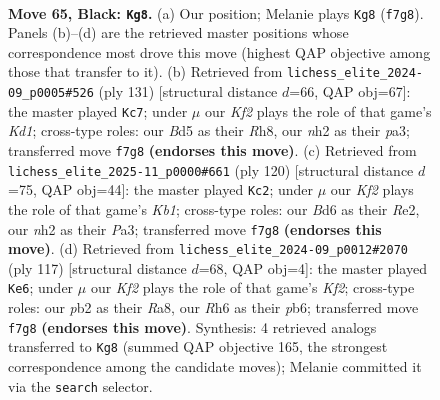\documentclass[11pt]{article}
\begin{document}
\begin{figure}[p]\centering
\begin{subfigure}{0.46\textwidth}\centering
\resizebox{\linewidth}{!}{%
\newchessgame
\chessboard[
  setfen={4r3/5kp1/p2b3r/Pppb1p1p/2p2P1P/2B1P1P1/1P2K2N/1R4R1 b - - 3 65},
  showmover=false,
  pgfstyle=straightmove, color=movearrow, markmove={f7-g8}
]}
\caption{}
\end{subfigure}\hfill
\begin{subfigure}{0.46\textwidth}\centering
\resizebox{\linewidth}{!}{%
\newchessgame
\chessboard[
  setfen={2rk3r/3b1p2/4p1p1/1p1pP2p/pP3P2/P1P1K1P1/2R1B2P/3R4 b - - 72 66},
  showmover=false,
  pgfstyle=straightmove, color=movearrow, markmove={d8-c7}
]}
\caption{}
\end{subfigure}
\\[4pt]
\begin{subfigure}{0.46\textwidth}\centering
\resizebox{\linewidth}{!}{%
\newchessgame
\chessboard[
  setfen={8/8/r1r1pp2/1R1p1kp1/p2P3p/P1P2PbP/3BR1P1/1K6 w - - 16 61},
  showmover=false,
  pgfstyle=straightmove, color=movearrow, markmove={b1-c2}
]}
\caption{}
\end{subfigure}\hfill
\begin{subfigure}{0.46\textwidth}\centering
\resizebox{\linewidth}{!}{%
\newchessgame
\chessboard[
  setfen={r7/1b3k2/1Pp2pp1/r1Pp3p/PK2p3/2R1P1P1/4BP2/R7 b - - 5 59},
  showmover=false,
  pgfstyle=straightmove, color=movearrow, markmove={f7-e6}
]}
\caption{}
\end{subfigure}
\caption{\textbf{Move 65, Black: \texttt{Kg8}.} (a) Our position; Melanie plays \texttt{Kg8} (\texttt{f7g8}). Panels (b)--(d) are the retrieved master positions whose correspondence most drove this move (highest QAP objective among those that transfer to it). (b) Retrieved from \texttt{lichess\_elite\_2024-09\_p0005\#526} (ply 131) [structural distance $d$=66, QAP obj=67]: the master played \texttt{Kc7}; under $\mu$ our \emph{Kf2} plays the role of that game's \emph{Kd1}; cross-type roles: our \emph{B}d5 as their \emph{R}h8, our \emph{n}h2 as their \emph{p}a3; transferred move \texttt{f7g8} \textbf{(endorses this move)}. (c) Retrieved from \texttt{lichess\_elite\_2025-11\_p0000\#661} (ply 120) [structural distance $d$=75, QAP obj=44]: the master played \texttt{Kc2}; under $\mu$ our \emph{Kf2} plays the role of that game's \emph{Kb1}; cross-type roles: our \emph{B}d6 as their \emph{R}e2, our \emph{n}h2 as their \emph{P}a3; transferred move \texttt{f7g8} \textbf{(endorses this move)}. (d) Retrieved from \texttt{lichess\_elite\_2024-09\_p0012\#2070} (ply 117) [structural distance $d$=68, QAP obj=4]: the master played \texttt{Ke6}; under $\mu$ our \emph{Kf2} plays the role of that game's \emph{Kf2}; cross-type roles: our \emph{p}b2 as their \emph{R}a8, our \emph{R}h6 as their \emph{p}b6; transferred move \texttt{f7g8} \textbf{(endorses this move)}. Synthesis: 4 retrieved analogs transferred to \texttt{Kg8} (summed QAP objective 165, the strongest correspondence among the candidate moves); Melanie committed it via the \texttt{search} selector.}
\label{fig:thought-m129}
\end{figure}
\end{document}
